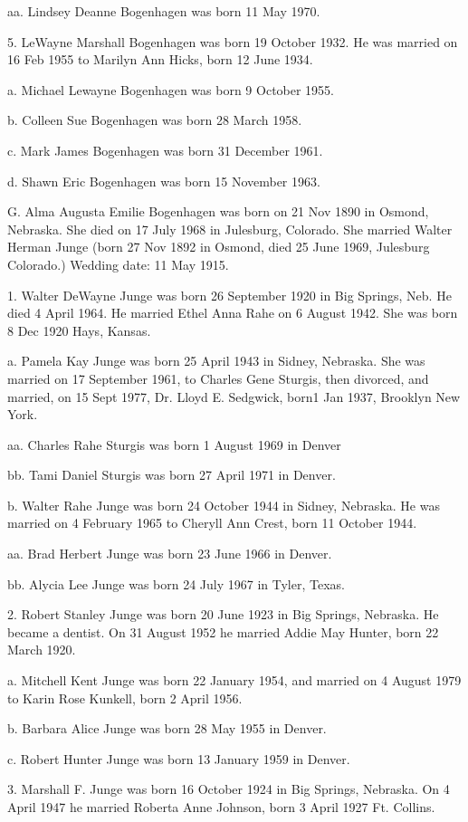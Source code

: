 \documentclass[a4paper]{article}
\begin{document}
aa. Lindsey Deanne Bogenhagen was born 11 May 1970.

5. LeWayne Marshall Bogenhagen was born 19 October 1932.  He was married on 16 Feb 1955 to Marilyn Ann Hicks, born 12 June 1934.
 
a. Michael Lewayne Bogenhagen was born 9 October 1955.

b. Colleen Sue Bogenhagen was born 28 March 1958.

c. Mark James Bogenhagen was born 31 December 1961.

d. Shawn Eric Bogenhagen was born 15 November 1963.  

G. Alma Augusta Emilie Bogenhagen was born on 21 Nov 1890 in Osmond, Nebraska. She died on 17 July 1968 in Julesburg, Colorado.  She married Walter Herman Junge (born 27 Nov 1892 in Osmond, died 25 June 1969, Julesburg Colorado.) Wedding date: 11 May 1915.

1. Walter DeWayne Junge was born 26 September 1920 in Big Springs, Neb. He died 4 April 1964.	He married Ethel Anna Rahe on 6 August 1942.  She was born 8 Dec 1920 Hays, Kansas.

a. Pamela Kay Junge was born 25 April 1943 in Sidney, Nebraska.  She was married on 17 September 1961, to Charles Gene Sturgis, then divorced, and married, on 15 Sept 1977, Dr. Lloyd E. Sedgwick, born1 Jan 1937, Brooklyn New York.

aa. Charles Rahe Sturgis was born 1 August 1969 in Denver

bb. Tami Daniel Sturgis was born 27 April 1971 in Denver.

b. Walter Rahe Junge was born 24 October 1944 in Sidney, Nebraska.  He was married on 4 February 1965 to Cheryll Ann Crest, born 11 October 1944.
  
aa. Brad Herbert Junge was born 23 June 1966 in Denver.

bb. Alycia Lee Junge was born 24 July 1967 in Tyler, Texas.

2.  Robert Stanley Junge was born 20 June 1923 in Big Springs, Nebraska.  He became a dentist.  On 31 August 1952 he married Addie May Hunter, born 22 March 1920.
 
a. Mitchell Kent Junge was born 22 January 1954, and married on 4 August 1979 to Karin Rose Kunkell, born 2 April 1956.
 
b. Barbara Alice Junge was born 28 May 1955 in Denver.

c. Robert Hunter Junge was born 13 January 1959 in Denver.

3. Marshall F. Junge was born 16 October 1924 in Big Springs, Nebraska.  On 4 April 1947 he married Roberta Anne Johnson, born 3 April 1927 Ft. Collins.
\end{document}
